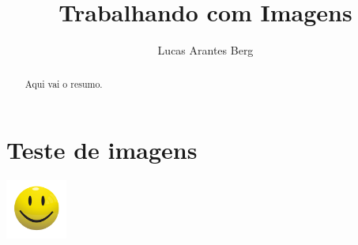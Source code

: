 \documentclass[]{article}
\title{Trabalhando com Imagens}
\author{Lucas Arantes Berg}
\begin{document}
\maketitle

\begin{abstract}
	Aqui vai o resumo.
\end{abstract}

\section{Teste de imagens}

\includegraphics[width=2cm]{figs/smiley.jpeg}
\end{document}

